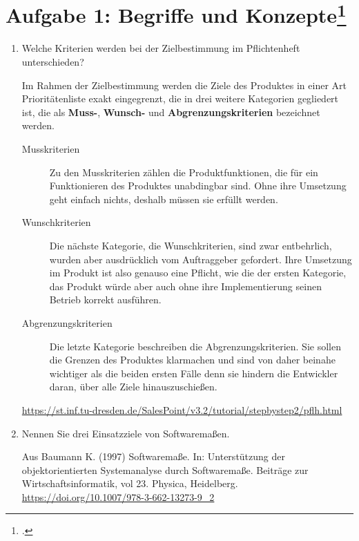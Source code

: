 \documentclass{lehramt-informatik-minimal}
\begin{document}
\section{Aufgabe 1: Begriffe und Konzepte\footcite{66116:2016:09}}

\begin{enumerate}


\item Welche Kriterien werden bei der Zielbestimmung im
Pflichtenheft unterschieden?

\begin{antwort}
Im Rahmen der Zielbestimmung werden die Ziele des Produktes in einer Art
Prioritätenliste exakt eingegrenzt, die in drei weitere Kategorien
gegliedert ist, die als \textbf{Muss-}, \textbf{Wunsch-} und
\textbf{Abgrenzungskriterien} bezeichnet werden.

\begin{description}
\item[Musskriterien] Zu den Musskriterien zählen die Produktfunktionen,
die für ein Funktionieren des Produktes unabdingbar sind. Ohne ihre
Umsetzung geht einfach nichts, deshalb müssen sie erfüllt werden.

\item[Wunschkriterien] Die nächste Kategorie, die Wunschkriterien, sind
zwar entbehrlich, wurden aber ausdrücklich vom Auftraggeber gefordert.
Ihre Umsetzung im Produkt ist also genauso eine Pflicht, wie die der
ersten Kategorie, das Produkt würde aber auch ohne ihre Implementierung
seinen Betrieb korrekt ausführen.

\item[Abgrenzungskriterien] Die letzte Kategorie  beschreiben die
Abgrenzungskriterien. Sie sollen die Grenzen des Produktes klarmachen
und sind von daher beinahe wichtiger als die beiden ersten Fälle denn
sie hindern die Entwickler daran, über alle Ziele hinauszuschießen.
\end{description}

\url{https://st.inf.tu-dresden.de/SalesPoint/v3.2/tutorial/stepbystep2/pflh.html}
\end{antwort}


\item Nennen Sie drei Einsatzziele von Softwaremaßen.

\begin{antwort}
Aus
Baumann K. (1997) Softwaremaße. In: Unterstützung der objektorientierten
Systemanalyse durch Softwaremaße. Beiträge zur Wirtschaftsinformatik,
vol 23. Physica, Heidelberg. \url{https://doi.org/10.1007/978-3-662-13273-9_2}


\end{antwort}
\end{enumerate}
\end{document}
